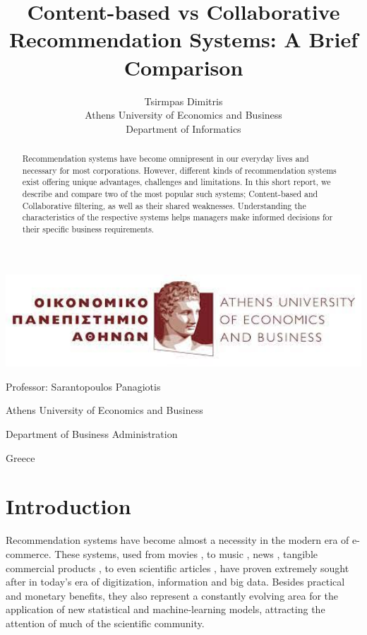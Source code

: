\documentclass[12pt, a4paper]{article}
\title{\Huge Content-based vs Collaborative Recommendation Systems: A Brief Comparison }
\author{\LARGE Tsirmpas Dimitris\\Athens University of Economics and Business\\Department of Informatics}
\begin{document}
\maketitle

\begin{center}
    \includegraphics[width=1\textwidth]{aueb_logo.jpg}
    
    \LARGE Professor: Sarantopoulos Panagiotis
    
    \large Athens University of Economics and Business
    
    \large Department of Business Administration
    
    \large Greece
    \newpage
    
\end{center}


\begin{abstract}
    Recommendation systems have become omnipresent in our everyday lives and necessary for most corporations. However, different kinds of recommendation systems exist offering unique advantages, challenges and limitations. In this short report, we describe and compare two of the most popular such systems; Content-based and Collaborative filtering, as well as their shared weaknesses. Understanding the characteristics of the respective systems helps managers make informed decisions for their specific business requirements.
\end{abstract}


\section{Introduction}
Recommendation systems have become almost a necessity in the modern era of e-commerce. These systems, used from movies \cite{movie1}, to music \cite{music1, music2}, news \cite{news1}, tangible commercial products \cite{commerce1, commerce2}, to even scientific articles \cite{scientific1}, have proven extremely sought after in today's era of digitization, information and big data. Besides practical and monetary benefits, they also represent a constantly evolving area for the application of new statistical and machine-learning models, attracting the attention of much of the scientific community.
\end{document}
